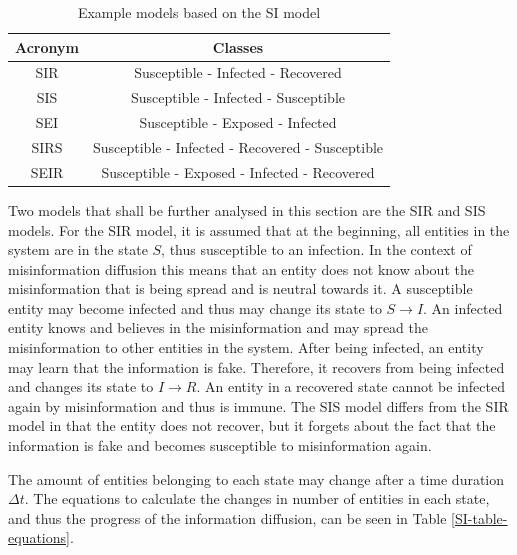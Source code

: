 \begin{table}[ht!]
    \centering
    \begin{tabular}{|c | c |} 
     \hline
     Acronym & Classes  \\ 
     \hline
     SIR & Susceptible - Infected - Recovered  \\ 
     \hline
     SIS & Susceptible - Infected - Susceptible \\
     \hline
     SEI & Susceptible - Exposed - Infected \\
     \hline
     SIRS & Susceptible - Infected - Recovered - Susceptible \\
     \hline
     SEIR & Susceptible - Exposed - Infected - Recovered \\
     \hline
    \end{tabular}
    \caption{Example models based on the SI 
    model  \cite{reviewinformationdiffusion}}
    \label{SI-table}
\end{table}

Two models that shall be further analysed in this section are the SIR and SIS models. 
For the SIR model, it is assumed that at the beginning, all entities in the 
system are in the state $S$, thus susceptible to an infection. In the context of 
misinformation diffusion this means that an entity does not know about the
misinformation that is being spread and is neutral towards it. A susceptible
entity may become infected and thus may change its state to $S\to I$.
An infected entity knows and believes in the misinformation and may
spread the misinformation to other entities in the system. After being infected,
an entity may learn that the information is fake. Therefore, it recovers 
from being infected and changes its state to $I\to R$. An entity in a 
recovered state cannot be infected again by misinformation and thus is immune.
The SIS model differs from the SIR model in that the entity does not recover,
but it \glqq forgets\grqq{} about the fact that the information is fake 
and becomes susceptible to misinformation again.

The amount of entities belonging to each state may change 
after a time duration $\Delta t$. The equations to calculate the 
changes in number of entities in each state, and thus the progress 
of the information diffusion, can be seen in Table \ref{SI-table-equations}.

